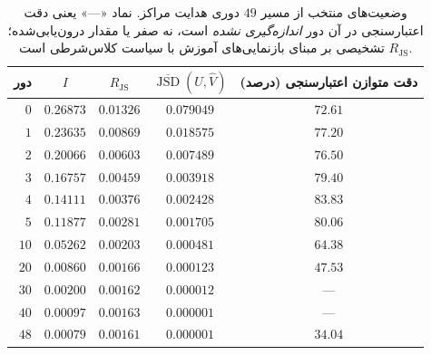 \begin{table}[htbp]
\centering\small
\caption{وضعیت‌های منتخب از مسیر $49$ دوری هدایت مراکز. نماد «---» یعنی دقت اعتبارسنجی در آن دور \emph{اندازه‌گیری نشده} است، نه صفر یا مقدار درون‌یابی‌شده؛ $R_{\mathrm{JS}}$ تشخیصی بر مبنای بازنمایی‌های آموزش با سیاست کلاس‌شرطی است.}
\label{tab:ch4-center-trajectory-selected}
\begin{tabular}{rcccc}\hline
دور & $I$ & $R_{\mathrm{JS}}$ & $\overline{\operatorname{JSD}}(U,\widehat V)$ & دقت متوازن اعتبارسنجی (درصد)\\\hline
$0$ & $0.26873$ & $0.01326$ & $0.079049$ & $72.61$\\
$1$ & $0.23635$ & $0.00869$ & $0.018575$ & $77.20$\\
$2$ & $0.20066$ & $0.00603$ & $0.007489$ & $76.50$\\
$3$ & $0.16757$ & $0.00459$ & $0.003918$ & $79.40$\\
$4$ & $0.14111$ & $0.00376$ & $0.002428$ & $83.83$\\
$5$ & $0.11877$ & $0.00281$ & $0.001705$ & $80.06$\\
$10$ & $0.05262$ & $0.00203$ & $0.000481$ & $64.38$\\
$20$ & $0.00860$ & $0.00166$ & $0.000123$ & $47.53$\\
$30$ & $0.00200$ & $0.00162$ & $0.000012$ & ---\\
$40$ & $0.00097$ & $0.00163$ & $0.000001$ & ---\\
$48$ & $0.00079$ & $0.00161$ & $0.000001$ & $34.04$\\
\hline
\end{tabular}
\end{table}
